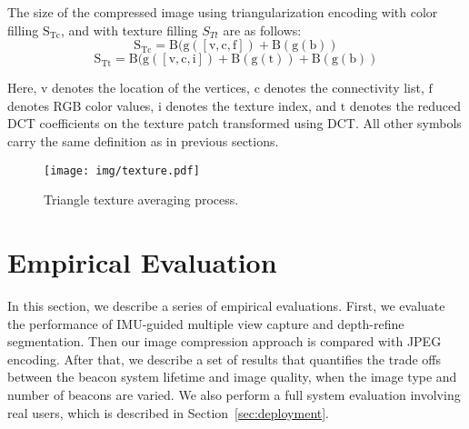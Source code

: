 	\vspace{.5em}

The size of the compressed image using triangularization encoding with color filling $\mathrm{S_{Tc}}$, and with texture filling $S_{Tt}$ are as follows:
\begin{equation}
\mathrm{S_{Tc} = B(g([v, c, f]) + B(g(b))}
\end{equation}
\begin{equation}
\mathrm{S_{Tt} = B(g([v, c, i]) + B(g(t)) + B(g(b))}
\end{equation}


Here, $\mathrm{v}$ denotes the location of the vertices, $\mathrm{c}$ denotes the connectivity list, $\mathrm{f}$ denotes RGB color values, $\mathrm{i}$ denotes the texture index, and $\mathrm{t}$ denotes the reduced DCT coefficients on the texture patch transformed using DCT. All other symbols carry the same definition as in previous sections.

\begin{figure}[!thb]
    \begin{center}
	    \texttt{[image: img/texture.pdf]}
	    \caption{\footnotesize Triangle texture averaging process.}
	    \label{fig:texture}
    \end{center}
\end{figure}

\section{Empirical Evaluation}
\label{sec:eval}

In this section, we describe a series of empirical evaluations. First, we evaluate the performance of IMU-guided multiple view capture and depth-refine segmentation. Then our image compression approach is compared with JPEG encoding. After that, we describe a set of results that quantifies the trade offs between the beacon system lifetime and image quality, when the image type and number of beacons are varied. We also perform a full system evaluation involving real users, which is described in Section~\ref{sec:deployment}.

